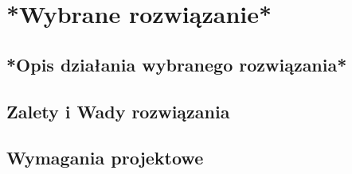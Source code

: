 \newpage
\section{*Wybrane rozwiązanie*} %

\subsection{*Opis działania wybranego rozwiązania*}
\subsection{Zalety i Wady rozwiązania}
\subsection{Wymagania projektowe}
